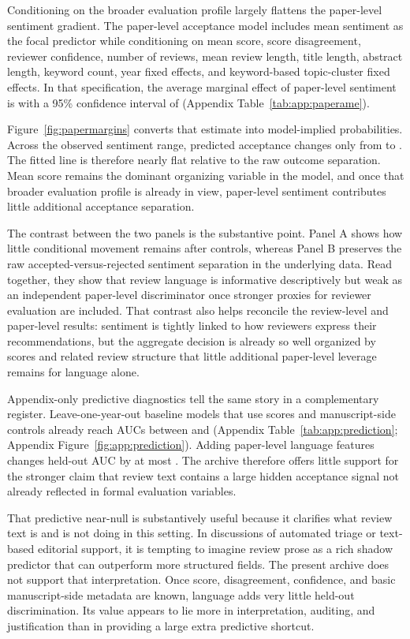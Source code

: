 \documentclass[9pt,twocolumn]{pnas-new}
\begin{document}
Conditioning on the broader evaluation profile largely flattens the paper-level sentiment gradient. The paper-level acceptance model includes mean sentiment as the focal predictor while conditioning on mean score, score disagreement, reviewer confidence, number of reviews, mean review length, title length, abstract length, keyword count, year fixed effects, and keyword-based topic-cluster fixed effects. In that specification, the average marginal effect of paper-level sentiment is \PaperSentimentAME{} with a 95\% confidence interval of \PaperSentimentAMECI{} (Appendix Table~\ref{tab:app:paperame}).

Figure~\ref{fig:papermargins} converts that estimate into model-implied probabilities. Across the observed sentiment range, predicted acceptance changes only from \PredProbLowSent{} to \PredProbHighSent{}. The fitted line is therefore nearly flat relative to the raw outcome separation. Mean score remains the dominant organizing variable in the model, and once that broader evaluation profile is already in view, paper-level sentiment contributes little additional acceptance separation.

The contrast between the two panels is the substantive point. Panel A shows how little conditional movement remains after controls, whereas Panel B preserves the raw accepted-versus-rejected sentiment separation in the underlying data. Read together, they show that review language is informative descriptively but weak as an independent paper-level discriminator once stronger proxies for reviewer evaluation are included. That contrast also helps reconcile the review-level and paper-level results: sentiment is tightly linked to how reviewers express their recommendations, but the aggregate decision is already so well organized by scores and related review structure that little additional paper-level leverage remains for language alone.

Appendix-only predictive diagnostics tell the same story in a complementary register. Leave-one-year-out baseline models that use scores and manuscript-side controls already reach AUCs between \BaselineAUCMin{} and \BaselineAUCMax{} (Appendix Table~\ref{tab:app:prediction}; Appendix Figure~\ref{fig:app:prediction}). Adding paper-level language features changes held-out AUC by at most \MaxAbsDeltaAUC{}. The archive therefore offers little support for the stronger claim that review text contains a large hidden acceptance signal not already reflected in formal evaluation variables.

That predictive near-null is substantively useful because it clarifies what review text is and is not doing in this setting. In discussions of automated triage or text-based editorial support, it is tempting to imagine review prose as a rich shadow predictor that can outperform more structured fields. The present archive does not support that interpretation. Once score, disagreement, confidence, and basic manuscript-side metadata are known, language adds very little held-out discrimination. Its value appears to lie more in interpretation, auditing, and justification than in providing a large extra predictive shortcut.
\end{document}
